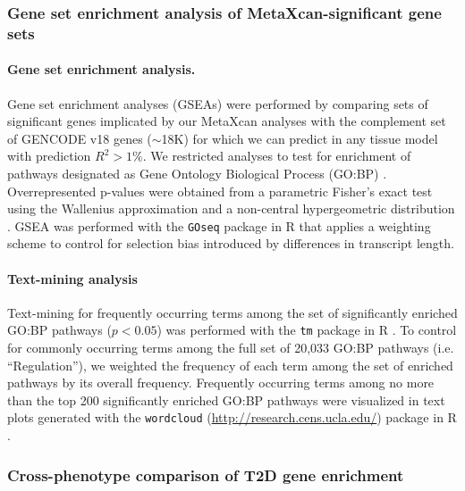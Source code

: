 \documentclass[10pt]{article}
\begin{document}
\subsubsection*{Gene set enrichment analysis of MetaXcan-significant gene sets}

\paragraph{Gene set enrichment analysis.} Gene set enrichment analyses (GSEAs) were performed by comparing sets of significant genes implicated by our MetaXcan analyses with the complement set of GENCODE v18 \cite{Harrow2012} genes ($\sim$18K) for which we can predict in any tissue model with prediction $R^{2} > 1\%$.  We restricted analyses to test for enrichment of pathways designated as Gene Ontology Biological Process (GO:BP) \cite{TheGeneOntologyConsortium2000}. Overrepresented p-values were obtained from a parametric Fisher’s exact test using the Wallenius approximation and a non-central hypergeometric distribution \cite{Young2010}. GSEA was performed with the \texttt{GOseq} package \cite{Young2010} in R \cite{RDevelopmentCoreTeam2011a} that applies a weighting scheme to control for selection bias introduced by differences in transcript length. 

\paragraph{Text-mining analysis} Text-mining for frequently occurring terms among the set of significantly enriched GO:BP pathways ($p < 0.05$) was performed with the \texttt{tm} package \cite{Feinerer2008} in R \cite{RDevelopmentCoreTeam2011a}. To control for commonly occurring terms among the full set of 20,033 GO:BP pathways (i.e. “Regulation”), we weighted the frequency of each term among the set of enriched pathways by its overall frequency. Frequently occurring terms among no more than the top 200 significantly enriched GO:BP pathways were visualized in text plots generated with the \texttt{wordcloud} (\url{http://research.cens.ucla.edu/}) package in R \cite{RDevelopmentCoreTeam2011a}. 


\subsubsection*{Cross-phenotype comparison of T2D gene enrichment}
\end{document}
